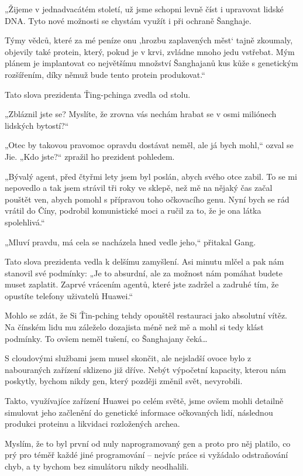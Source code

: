 „Žijeme v jednadvacátém století, už jsme schopni levně číst i upravovat lidské DNA. Tyto nové možnosti se chystám využít i při ochraně Šanghaje.

Týmy vědců, které za mé peníze onu ‚hrozbu zaplavených měst‘ tajně zkoumaly, objevily také protein, který, pokud je v krvi, zvládne mnoho jedu vstřebat. Mým plánem je implantovat co největšímu množství Šanghajanů kus kůže s genetickým rozšířením, díky němuž bude tento protein produkovat.“

Tato slova prezidenta Ťing-pchinga zvedla od stolu.

„Zbláznil jste se? Myslíte, že zrovna vás nechám hrabat se v osmi miliónech lidských bytostí?“ 

„Otec by takovou pravomoc opravdu dostávat neměl, ale já bych mohl,“ ozval se Jie.
„Kdo jste?“ zpražil ho prezident pohledem.

„Bývalý agent, před čtyřmi lety jsem byl poslán, abych svého otce zabil. To se mi nepovedlo a tak jsem strávil tři roky ve sklepě, než mě na nějaký čas začal pouštět ven, abych pomohl s přípravou toho očkovacího genu. Nyní bych se rád vrátil do Číny, podrobil komunistické moci a ručil za to, že je ona látka spolehlivá.“

„Mluví pravdu, má cela se nacházela hned vedle jeho,“ přitakal Gang.

Tato slova prezidenta vedla k delšímu zamyšlení. Asi minutu mlčel a pak nám stanovil své podmínky: „Je to absurdní, ale za možnost nám pomáhat budete muset zaplatit. Zaprvé vrácením agentů, které jste zadržel a zadruhé tím, že opustíte telefony uživatelů Huawei.“

Mohlo se zdát, že Si Ťin-pching tehdy opouštěl restauraci jako absolutní vítěz. Na čínském lidu mu záleželo dozajista méně než mě a mohl si tedy klást podmínky. To ovšem neměl tušení, co Šanghajany čeká…

S cloudovými službami jsem musel skončit, ale nejsladší ovoce bylo z nabouraných zařízení sklizeno již dříve. Nebýt výpočetní kapacity, kterou nám poskytly, bychom nikdy gen, který později změnil svět, nevyrobili.

Takto, využívajíce zařízení Huawei po celém světě, jsme ovšem mohli detailně simulovat jeho začlenění do genetické informace očkovaných lidí, následnou produkci proteinu a likvidaci rozložených archea.

Myslím, že to byl první od nuly naprogramovaný gen a proto pro něj platilo, co prý pro téměř každé jiné programování – nejvíc práce si vyžádalo odstraňování chyb, a ty bychom bez simulátoru nikdy neodhalili.

